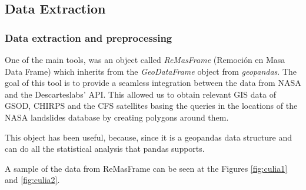 \documentclass[sigconf, nonacm]{acmart}
\begin{document}
    

\subsection{Data Extraction}


\subsubsection{Data extraction and preprocessing}

\noindent

One of the main tools, was an object called \emph{ReMasFrame} (Remoción en Masa Data Frame) which inherits from the \emph{GeoDataFrame} object from \emph{geopandas}. The goal of this tool is to provide a seamless integration between the data from NASA and the Descarteslabs' API. This allowed us to obtain relevant GIS data of GSOD, CHIRPS and the CFS satellites basing the queries in the locations of the NASA landslides database by creating polygons around them.

This object has been useful, because, since it is a geopandas data structure and can do all the statistical analysis that pandas supports.

A sample of the data from ReMasFrame can be seen at the Figures \ref{fig:culia1} and \ref{fig:culia2}.
\end{document}
